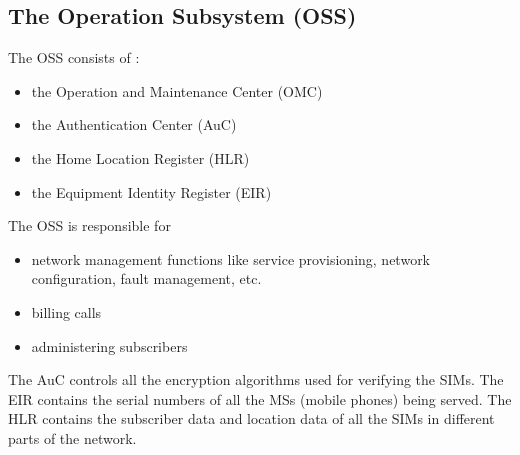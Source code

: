 \subsection{The Operation Subsystem (OSS)}

The OSS consists of :
\begin{itemize}[noitemsep,topsep=0pt,parsep=0pt,partopsep=0pt]
\item the Operation and Maintenance Center (OMC)
\item the Authentication Center (AuC)
\item the Home Location Register (HLR)
\item the Equipment Identity Register (EIR)
\end{itemize}

The OSS is responsible for
\begin{itemize}[noitemsep,topsep=0pt,parsep=0pt,partopsep=0pt]
\item network management functions like service provisioning, network 
configuration, fault management, etc.
\item billing calls
\item administering subscribers
\end{itemize}

The AuC controls all the encryption algorithms used for verifying the SIMs. 
The EIR contains the serial numbers of all the MSs (mobile phones) being 
served. The HLR contains the subscriber data and location data of all the 
SIMs in different parts of the network.

% 



